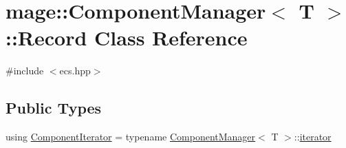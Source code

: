 \hypertarget{classmage_1_1_component_manager_1_1_record}{}\section{mage\+:\+:Component\+Manager$<$ T $>$\+:\+:Record Class Reference}
\label{classmage_1_1_component_manager_1_1_record}


{\ttfamily \#include $<$ecs.\+hpp$>$}

\subsection*{Public Types}
\begin{DoxyCompactItemize}
\item 
using \mbox{\hyperlink{classmage_1_1_component_manager_1_1_record_ac9f303d103be56826be484204f17c249}{Component\+Iterator}} = typename \mbox{\hyperlink{classmage_1_1_component_manager}{Component\+Manager}}$<$ T $>$\+::\mbox{\hyperlink{classmage_1_1_component_manager_a28023a75938eb74870ba4b5952ddb61f}{iterator}}
\end{DoxyCompactItemize}
